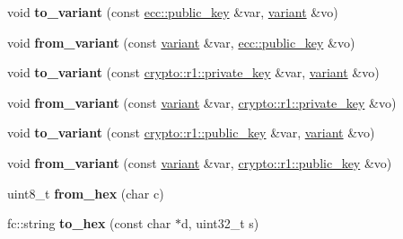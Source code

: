 \begin{DoxyCompactItemize}
\item 
\mbox{\label{namespacefc_a2efa4277a8711d153a5b4b84aab9d0c1}} 
void {\bfseries to\+\_\+variant} (const \mbox{\hyperlink{classfc_1_1ecc_1_1public__key}{ecc\+::public\+\_\+key}} \&var, \mbox{\hyperlink{classfc_1_1variant}{variant}} \&vo)
\item 
\mbox{\label{namespacefc_a8b226663d63ffa4a1de81b8b0166e097}} 
void {\bfseries from\+\_\+variant} (const \mbox{\hyperlink{classfc_1_1variant}{variant}} \&var, \mbox{\hyperlink{classfc_1_1ecc_1_1public__key}{ecc\+::public\+\_\+key}} \&vo)
\item 
\mbox{\label{namespacefc_aba68c5966033307cdd8a92b5bce2241a}} 
void {\bfseries to\+\_\+variant} (const \mbox{\hyperlink{classfc_1_1crypto_1_1r1_1_1private__key}{crypto\+::r1\+::private\+\_\+key}} \&var, \mbox{\hyperlink{classfc_1_1variant}{variant}} \&vo)
\item 
\mbox{\label{namespacefc_a2c5928040aa8f58911b9f977aac56108}} 
void {\bfseries from\+\_\+variant} (const \mbox{\hyperlink{classfc_1_1variant}{variant}} \&var, \mbox{\hyperlink{classfc_1_1crypto_1_1r1_1_1private__key}{crypto\+::r1\+::private\+\_\+key}} \&vo)
\item 
\mbox{\label{namespacefc_a76c04110e74473afe1c5378b9e1e2232}} 
void {\bfseries to\+\_\+variant} (const \mbox{\hyperlink{classfc_1_1crypto_1_1r1_1_1public__key}{crypto\+::r1\+::public\+\_\+key}} \&var, \mbox{\hyperlink{classfc_1_1variant}{variant}} \&vo)
\item 
\mbox{\label{namespacefc_a37fabf2794eb855bf5c196696fe49d4a}} 
void {\bfseries from\+\_\+variant} (const \mbox{\hyperlink{classfc_1_1variant}{variant}} \&var, \mbox{\hyperlink{classfc_1_1crypto_1_1r1_1_1public__key}{crypto\+::r1\+::public\+\_\+key}} \&vo)
\item 
\mbox{\label{namespacefc_a6a0fb5b79914774be4ab66462362b292}} 
uint8\+\_\+t {\bfseries from\+\_\+hex} (char c)
\item 
\mbox{\label{namespacefc_aab567c89004d329f560014d9943afcd6}} 
fc\+::string {\bfseries to\+\_\+hex} (const char $\ast$d, uint32\+\_\+t s)
\item 

\end{DoxyCompactItemize}
